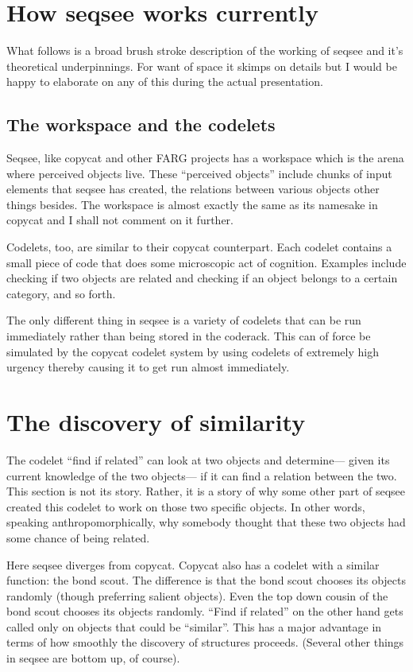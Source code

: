 \documentclass{article}
\begin{document}
\section{How seqsee works currently}
\label{sec:how}

What follows is a broad brush stroke description of the working of seqsee and it's theoretical underpinnings.  For want of space it skimps on details but I would be happy to elaborate on any of this during the actual presentation.

\subsection{The workspace and the codelets}

Seqsee, like copycat and other FARG projects has a workspace which is the arena where perceived objects live.  These ``perceived objects'' include chunks of input elements that seqsee has created, the relations between various objects other things besides.  The workspace is almost exactly the same as its namesake in copycat and I shall not comment on it further.

Codelets, too, are similar to their copycat counterpart. Each codelet contains a small piece of code that does some microscopic act of cognition.  Examples include checking if two objects are related and checking if an object belongs to a certain category, and so forth.

The only different thing in seqsee is a variety of codelets that can be run immediately rather than being stored in the coderack.  This can of force be simulated by the copycat codelet system by using codelets of extremely high urgency thereby causing it to get run almost immediately.

\section{The discovery of similarity}

The codelet ``find if related'' can look at two objects and determine--- given its current knowledge of the two objects--- if it can find a relation between the two.  This section is not its story.  Rather, it is a story of why some other part of seqsee created this codelet to work on those two specific objects.  In other words, speaking anthropomorphically, why somebody thought that these two objects had some chance of being related.

Here seqsee diverges from copycat.  Copycat also has a codelet with a similar function: the bond scout.  The difference is that the bond scout chooses its objects randomly (though preferring salient objects).  Even the top down cousin of the bond scout chooses its objects randomly.  ``Find if related'' on the other hand gets called only on objects that could be ``similar''.  This has a major advantage in terms of how smoothly the discovery of structures proceeds.  (Several other things in seqsee are bottom up, of course).
\end{document}
